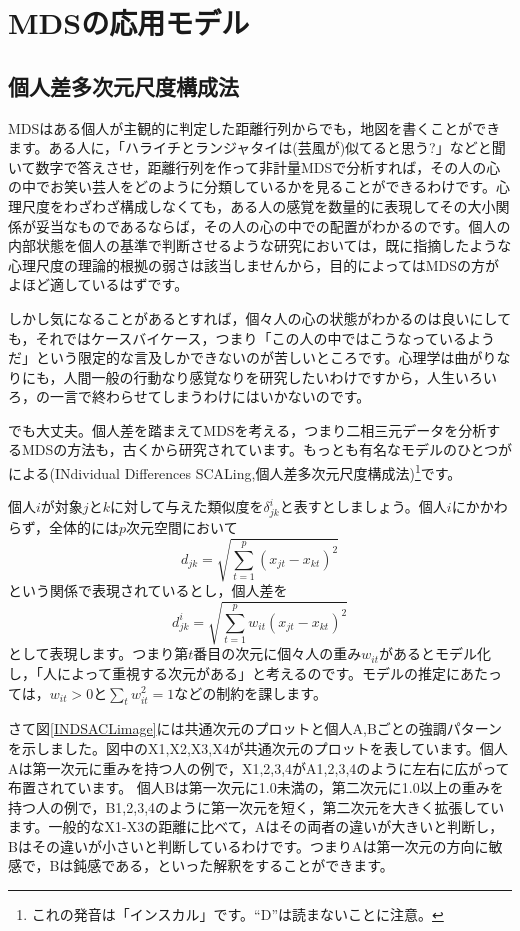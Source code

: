 \documentclass{ltjsbook}
\begin{document}
\section{MDSの応用モデル}
\subsection{個人差多次元尺度構成法}
MDSはある個人が主観的に判定した距離行列からでも，地図を書くことができます。ある人に，「ハライチとランジャタイは(芸風が)似てると思う?」などと聞いて数字で答えさせ，距離行列を作って非計量MDSで分析すれば，その人の心の中でお笑い芸人をどのように分類しているかを見ることができるわけです。心理尺度をわざわざ構成しなくても，ある人の感覚を数量的に表現してその大小関係が妥当なものであるならば，その人の心の中での配置がわかるのです。個人の内部状態を個人の基準で判断させるような研究においては，既に指摘したような心理尺度の理論的根拠の弱さは該当しませんから，目的によってはMDSの方がよほど適しているはずです。

しかし気になることがあるとすれば，個々人の心の状態がわかるのは良いにしても，それではケースバイケース，つまり「この人の中ではこうなっているようだ」という限定的な言及しかできないのが苦しいところです。心理学は曲がりなりにも，人間一般の行動なり感覚なりを研究したいわけですから，人生いろいろ，の一言で終わらせてしまうわけにはいかないのです。

でも大丈夫。個人差を踏まえてMDSを考える，つまり二相三元データを分析するMDSの方法も，古くから研究されています。もっとも有名なモデルのひとつが\textcite{carroll1970analysis}による(INdividual Differences SCALing,個人差多次元尺度構成法)\footnote{これの発音は「インスカル」です。``D''は読まないことに注意。}です。

個人$i$が対象$j$と$k$に対して与えた類似度を$\delta_{jk}^i$と表すとしましょう。個人$i$にかかわらず，全体的には$p$次元空間において
\[ d_{jk} = \sqrt{\sum_{t=1}^p (x_{jt}-x_{kt})^2} \]
という関係で表現されているとし，個人差を
\[ d_{jk}^i = \sqrt{\sum_{t=1}^p w_{it}(x_{jt}-x_{kt})^2} \]
として表現します。つまり第$t$番目の次元に個々人の重み$w_{it}$があるとモデル化し，「人によって重視する次元がある」と考えるのです。モデルの推定にあたっては，$w_{it}\gt 0$と$\sum_t w_{it}^2=1$などの制約を課します。

さて図\ref{INDSACLimage}には共通次元のプロットと個人A,Bごとの強調パターンを示しました。図中のX1,X2,X3,X4が共通次元のプロットを表しています。個人Aは第一次元に重みを持つ人の例で，X1,2,3,4がA1,2,3,4のように左右に広がって布置されています。
個人Bは第一次元に1.0未満の，第二次元に1.0以上の重みを持つ人の例で，B1,2,3,4のように第一次元を短く，第二次元を大きく拡張しています。一般的なX1-X3の距離に比べて，Aはその両者の違いが大きいと判断し，Bはその違いが小さいと判断しているわけです。つまりAは第一次元の方向に敏感で，Bは鈍感である，といった解釈をすることができます。
\end{document}
